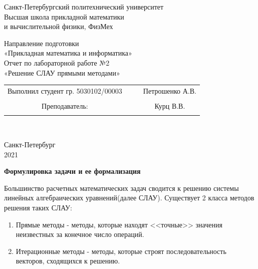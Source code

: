 \documentclass{article}
\begin{document}
	\begin{center}
		\hfill \break
		\begin{center}
			\huge{Санкт-Петербургский политехнический университет\\
				Высшая школа прикладной математики\\
				и вычислительной физики, ФизМех}
		\end{center}
		\hfill \break
		\hfill \break
		\hfill \break
		\hfill \break
		\hfill \break
		\huge{Направление подготовки\\
			«Прикладная математика и информатика»}\\
		\hfill \break
		\hfill \break
		\hfill \break
		\hfill \break
		\hfill \break
		\hfill \break
		\fontsize{14pt}{14pt}\selectfont
		Отчет по лабораторной работе №2\\
		«Решение СЛАУ прямыми методами»\\
		\hfill \break
		\hfill \break
		\hfill \break
		\hfill \break
		\hfill \break
	\end{center}
	\hfill \break
	\hfill \break
	\fontsize{12pt}{12pt}\selectfont
	\begin{tabular}{cccc}
		\hspace{1cm}Выполнил студент гр. 5030102/00003 & {\hspace{3cm}} & & Петрошенко А.В. \\\\
		\hspace{-3cm}Преподаватель: &{\hspace{1cm}}& & {\hspace{1cm}} Курц В.В. \\\\
	\end{tabular}\\
	\hfill \break
	\hfill \break
	\hfill \break
	\hfill \break
	\hfill \break
	\hfill \break
	\begin{center} Санкт-Петербург\\ 
		2021\\
	\end{center}
	\thispagestyle{empty}
	\newpage
	\begin{center} \textbf{Формулировка задачи и ее формализация}\end{center}
	Большинство расчетных математических задач сводится к решению системы линейных алгебраических уравнений(далее СЛАУ). Существует 2 класса методов решения таких СЛАУ:
	\begin{enumerate}
		\item Прямые методы - методы, которые находят <<точные>> значения неизвестных за конечное число операций.
		\item Итерационные методы - методы, которые строят последовательность векторов, сходящихся к решению.
	\end{enumerate}
\end{document}

